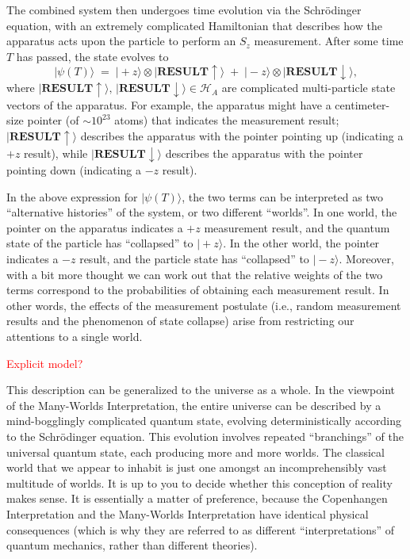 \documentclass[pra,11pt]{revtex4}
\begin{document}
The combined system then undergoes time evolution via the
Schr\"odinger equation, with an extremely complicated Hamiltonian that
describes how the apparatus acts upon the particle to perform an $S_z$
measurement.  After some time $T$ has passed, the state evolves to
$$|\psi(T)\rangle \;=\; |\!+z \rangle \otimes |\textbf{RESULT}\uparrow\rangle \;+\; |\!-z\rangle\otimes |\textbf{RESULT}\downarrow\rangle, $$
where $|\textbf{RESULT}\uparrow\rangle, \,
|\textbf{RESULT}\downarrow\rangle \in \mathscr{H}_A$ are complicated
multi-particle state vectors of the apparatus.  For example, the
apparatus might have a centimeter-size pointer (of $\sim 10^{23}$
atoms) that indicates the measurement result;
$|\textbf{RESULT}\uparrow\rangle$ describes the apparatus with the
pointer pointing up (indicating a $+z$ result), while
$|\textbf{RESULT}\downarrow\rangle$ describes the apparatus with the
pointer pointing down (indicating a $-z$ result).

In the above expression for $|\psi(T)\rangle$, the two terms can be
interpreted as two ``alternative histories'' of the system, or two
different ``worlds''.  In one world, the pointer on the apparatus
indicates a $+z$ measurement result, and the quantum state of the
particle has ``collapsed'' to $|\!+z\rangle$.  In the other world, the
pointer indicates a $-z$ result, and the particle state has
``collapsed'' to $|\!-z\rangle$.  Moreover, with a bit more thought we
can work out that the relative weights of the two terms correspond to
the probabilities of obtaining each measurement result.  In other
words, the effects of the measurement postulate (i.e., random
measurement results and the phenomenon of state collapse) arise from
restricting our attentions to a single world.

\textcolor{red}{Explicit model?}

This description can be generalized to the universe as a whole.  In
the viewpoint of the Many-Worlds Interpretation, the entire universe
can be described by a mind-bogglingly complicated quantum state,
evolving deterministically according to the Schr\"odinger equation.
This evolution involves repeated ``branchings'' of the universal
quantum state, each producing more and more worlds.  The classical
world that we appear to inhabit is just one amongst an
incomprehensibly vast multitude of worlds.  It is up to you to decide
whether this conception of reality makes sense.  It is essentially a
matter of preference, because the Copenhangen Interpretation and the
Many-Worlds Interpretation have identical physical consequences (which
is why they are referred to as different ``interpretations'' of
quantum mechanics, rather than different theories).
\end{document}
